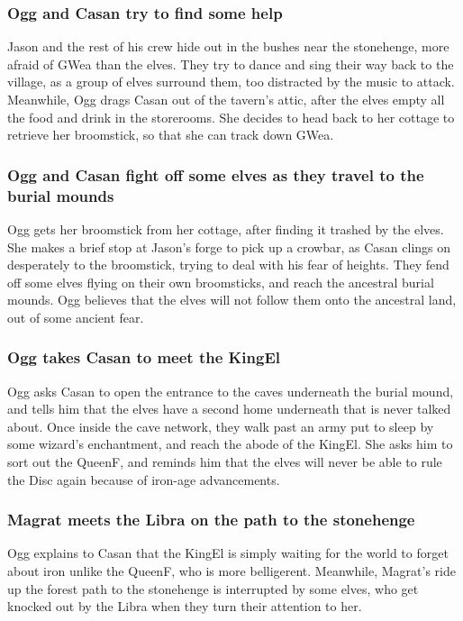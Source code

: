 \subsubsection{\Gls{Ogg} and \Gls{Casan} try to find some help}
\Gls{Jason} and the rest of his crew hide out in the bushes near the stonehenge, more afraid of
\Gls{GWea} than the elves. They try to dance and sing their way back to the village, as a group of
elves surround them, too distracted by the music to attack. Meanwhile, \Gls{Ogg} drags \Gls{Casan}
out of the tavern's attic, after the elves empty all the food and drink in the storerooms. She
decides to head back to her cottage to retrieve her broomstick, so that she can track down
\Gls{GWea}.

\subsubsection{\Gls{Ogg} and \Gls{Casan} fight off some elves as they travel to the burial mounds}
\Gls{Ogg} gets her broomstick from her cottage, after finding it trashed by the elves. She makes a
brief stop at \Gls{Jason}'s forge to pick up a crowbar, as \Gls{Casan} clings on desperately to the
broomstick, trying to deal with his fear of heights. They fend off some elves flying on their own
broomsticks, and reach the ancestral burial mounds. \Gls{Ogg} believes that the elves will not
follow them onto the ancestral land, out of some ancient fear.

\subsubsection{\Gls{Ogg} takes \Gls{Casan} to meet the \Gls{KingEl}}
\Gls{Ogg} asks \Gls{Casan} to open the entrance to the caves underneath the burial mound, and tells
him that the elves have a second home underneath that is never talked about. Once inside the cave
network, they walk past an army put to sleep by some wizard's enchantment, and reach the abode of
the \Gls{KingEl}. She asks him to sort out the \Gls{QueenF}, and reminds him that the elves will
never be able to rule the Disc again because of iron-age advancements.

\subsubsection{\Gls{Magrat} meets the \Gls{Libra} on the path to the stonehenge}
\Gls{Ogg} explains to \Gls{Casan} that the \Gls{KingEl} is simply waiting for the world to forget
about iron unlike the \Gls{QueenF}, who is more belligerent. Meanwhile, \Gls{Magrat}'s ride up the
forest path to the stonehenge is interrupted by some elves, who get knocked out by the \Gls{Libra}
when they turn their attention to her.

